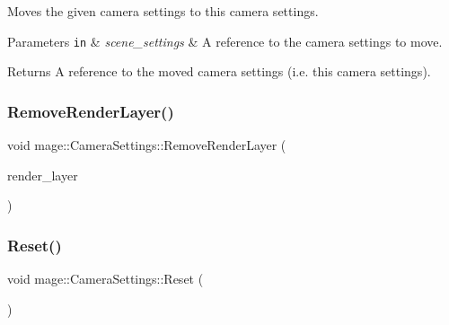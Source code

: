 Moves the given camera settings to this camera settings.


\begin{DoxyParams}[1]{Parameters}
\mbox{\tt in}  & {\em scene\+\_\+settings} & A reference to the camera settings to move. \\
\hline
\end{DoxyParams}
\begin{DoxyReturn}{Returns}
A reference to the moved camera settings (i.\+e. this camera settings). 
\end{DoxyReturn}
\hypertarget{classmage_1_1_camera_settings_a358ab9da30af67ca8b1ea2a5eb5a2710}{}\label{classmage_1_1_camera_settings_a358ab9da30af67ca8b1ea2a5eb5a2710} 
\subsubsection{\texorpdfstring{Remove\+Render\+Layer()}{RemoveRenderLayer()}}
{\footnotesize\ttfamily void mage\+::\+Camera\+Settings\+::\+Remove\+Render\+Layer (\begin{DoxyParamCaption}\item[{\hyperlink{namespacemage_a8b4a82582105b0299e2c2be5af7255d6}{Render\+Layer}}]{render\+\_\+layer }\end{DoxyParamCaption})\hspace{0.3cm}{\ttfamily [noexcept]}}

\hypertarget{classmage_1_1_camera_settings_a4894cae6954c111339be554e8dd9562c}{}\label{classmage_1_1_camera_settings_a4894cae6954c111339be554e8dd9562c} 
\subsubsection{\texorpdfstring{Reset()}{Reset()}}
{\footnotesize\ttfamily void mage\+::\+Camera\+Settings\+::\+Reset (\begin{DoxyParamCaption}{ }\end{DoxyParamCaption})\hspace{0.3cm}{\ttfamily [noexcept]}}

\hypertarget{classmage_1_1_camera_settings_a1f8b3952282d153db4fb6416e9d933b7}{}\label{classmage_1_1_camera_settings_a1f8b3952282d153db4fb6416e9d933b7} 
